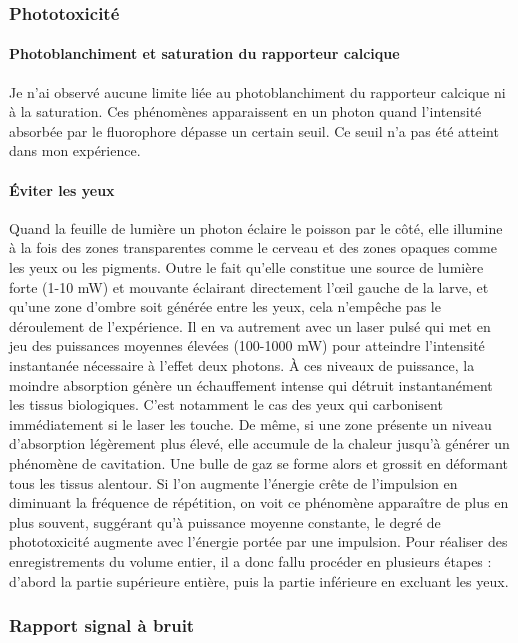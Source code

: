 \subsubsection{Phototoxicité}

\paragraph{Photoblanchiment et saturation du rapporteur calcique}
Je n'ai observé aucune limite liée au photoblanchiment du rapporteur calcique ni à la saturation. Ces phénomènes apparaissent en un photon quand l'intensité absorbée par le fluorophore dépasse un certain seuil. Ce seuil n'a pas été atteint dans mon expérience.

\paragraph{Éviter les yeux}
Quand la feuille de lumière un photon éclaire le poisson par le côté, elle illumine à la fois des zones transparentes comme le cerveau et des zones opaques comme les yeux ou les pigments. Outre le fait qu'elle constitue une source de lumière forte (1-10 mW) et mouvante éclairant directement l'œil gauche de la larve, et qu'une zone d'ombre soit générée entre les yeux, cela n'empêche pas le déroulement de l'expérience. Il en va autrement avec un laser pulsé qui met en jeu des puissances moyennes élevées (100-1000 mW) pour atteindre l'intensité instantanée nécessaire à l'effet deux photons. À ces niveaux de puissance, la moindre absorption génère un échauffement intense qui détruit instantanément les tissus biologiques. C'est notamment le cas des yeux qui carbonisent immédiatement si le laser les touche. De même, si une zone présente un niveau d'absorption légèrement plus élevé, elle accumule de la chaleur jusqu'à générer un phénomène de cavitation. Une bulle de gaz se forme alors et grossit en déformant tous les tissus alentour. Si l'on augmente l'énergie crête de l'impulsion en diminuant la fréquence de répétition, on voit ce phénomène apparaître de plus en plus souvent, suggérant qu'à puissance moyenne constante, le degré de phototoxicité augmente avec l'énergie portée par une impulsion. Pour réaliser des enregistrements du volume entier, il a donc fallu procéder en plusieurs étapes : d'abord la partie supérieure entière, puis la partie inférieure en excluant les yeux. 

\subsubsection{Rapport signal à bruit}

